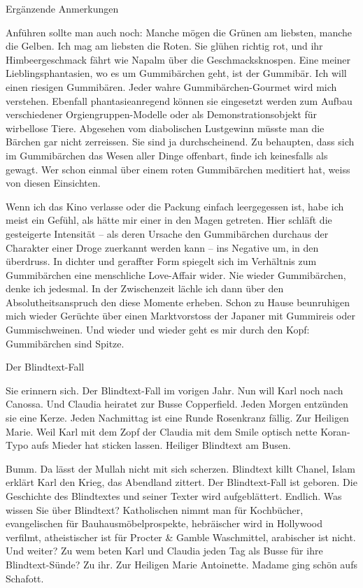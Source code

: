 Ergänzende Anmerkungen

Anführen sollte man auch noch: Manche mögen die Grünen am liebsten, manche die Gelben. Ich mag am liebsten die Roten. Sie glühen richtig rot, und ihr Himbeergeschmack fährt wie Napalm über die Geschmacksknospen. Eine meiner Lieblingsphantasien, wo es um Gummibärchen geht, ist der Gummibär. Ich will einen riesigen Gummibären. Jeder wahre Gummibärchen-Gourmet wird mich verstehen. Ebenfall phantasieanregend können sie eingesetzt werden zum Aufbau verschiedener Orgiengruppen-Modelle oder als Demonstrationsobjekt für wirbellose Tiere. Abgesehen vom diabolischen Lustgewinn müsste man die Bärchen gar nicht zerreissen. Sie sind ja durchscheinend. Zu behaupten, dass sich im Gummibärchen das Wesen aller Dinge offenbart, finde ich keinesfalls als gewagt. Wer schon einmal über einem roten Gummibärchen meditiert hat, weiss von diesen Einsichten.

Wenn ich das Kino verlasse oder die Packung einfach leergegessen ist, habe ich meist ein Gefühl, als hätte mir einer in den Magen getreten. Hier schläft die gesteigerte Intensität -- als deren Ursache den Gummibärchen durchaus der Charakter einer Droge zuerkannt werden kann -- ins Negative um, in den überdruss. In dichter und geraffter Form spiegelt sich im Verhältnis zum Gummibärchen eine menschliche Love-Affair wider. Nie wieder Gummibärchen, denke ich jedesmal. In der Zwischenzeit lächle ich dann über den Absolutheitsanspruch den diese Momente erheben. Schon zu Hause beunruhigen mich wieder Gerüchte über einen Marktvorstoss der Japaner mit Gummireis oder Gummischweinen. Und wieder und wieder geht es mir durch den Kopf: Gummibärchen sind Spitze.

Der Blindtext-Fall

Sie erinnern sich. Der Blindtext-Fall im vorigen Jahr. Nun will Karl noch nach Canossa. Und Claudia heiratet zur Busse Copperfield. Jeden Morgen entzünden sie eine Kerze. Jeden Nachmittag ist eine Runde Rosenkranz fällig. Zur Heiligen Marie. Weil Karl mit dem Zopf der Claudia mit dem Smile optisch nette Koran-Typo aufs Mieder hat sticken lassen. Heiliger Blindtext am Busen.

Bumm. Da lässt der Mullah nicht mit sich scherzen. Blindtext killt Chanel, Islam erklärt Karl den Krieg, das Abendland zittert. Der Blindtext-Fall ist geboren. Die Geschichte des Blindtextes und seiner Texter wird aufgeblättert. Endlich. Was wissen Sie über Blindtext? Katholischen nimmt man für Kochbücher, evangelischen für Bauhausmöbelprospekte, hebräischer wird in Hollywood verfilmt, atheistischer ist für Procter \& Gamble Waschmittel, arabischer ist nicht. Und weiter? Zu wem beten Karl und Claudia jeden Tag als Busse für ihre Blindtext-Sünde? Zu ihr. Zur Heiligen Marie Antoinette. Madame ging schön aufs Schafott.

